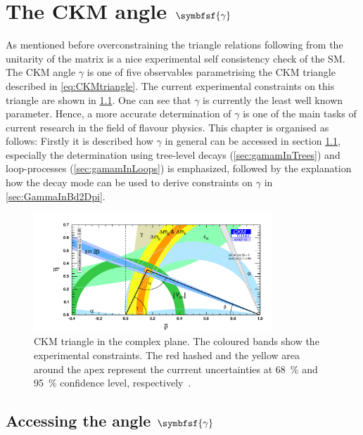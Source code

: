 \chapter[head={The CKM angle $\gamma$},tocentry={The CKM angle $\symbfsf{\gamma}$}]{The CKM angle $\symbfsf{\gamma}$}
\label{ch:CKMAngleGamma}

As mentioned before overconstraining the triangle relations following from the unitarity of the matrix is a nice experimental self consistency check of the \ac{SM}.
The CKM angle $\gamma$ is one of five observables parametrising the CKM triangle described in \cref{eq:CKMtriangle}.
The current experimental constraints on this triangle are shown in \cref{fig:ckmtriangle}.
One can see that $\gamma$ is currently the least well known parameter.
Hence, a more accurate determination of $\gamma$ is one of the main tasks of current research in the field of flavour physics.
This chapter is organised as follows: Firstly it is described how $\gamma$ in general can be accessed in section \cref{sec:accessGamma}, especially the determination using tree-level decays (\cref{sec:gamamInTrees}) and loop-processes (\cref{sec:gamamInLoops}) is emphasized, followed by the explanation how the decay mode \BdToDpi can be used to derive constraints on $\gamma$ in \cref{sec:GammaInBd2Dpi}.

\begin{figure}[tbp]
	\centering
	\includegraphics[width=0.8\textwidth]{04gamma/figs/CKMTriangle.pdf}
	\caption{CKM triangle in the complex plane.
	The coloured bands show the experimental constraints.
	The red hashed and the yellow area around the apex represent the currrent uncertainties at \SI{68}{\percent} and \SI{95}{\percent} confidence level, respectively~\cite{CKMfitter2015}.}
	\label{fig:ckmtriangle}
\end{figure}

\section[head={Accessing the angle $\gamma$},tocentry={Accessing the angle $\gamma$}]{Accessing the angle $\symbfsf{\gamma}$}
\label{sec:accessGamma}


